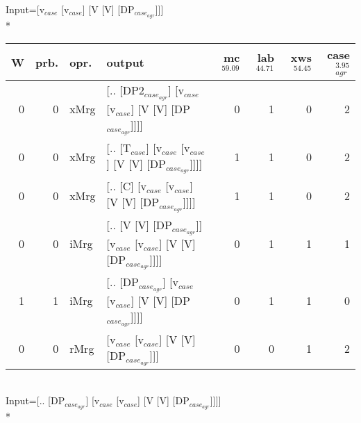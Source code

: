 \begingroup\scriptsize Input=[v$_{case}$ [v$_{case}$] [V [V] [DP$_{case_{agr}}$]]]\\*
\begin{tabularx}{\linewidth}{rrlXrrrr}
\hline
   W &   prb. & opr.   & output                                                             &   mc$^{59.09}$ &   lab$^{44.71}$ &   xws$^{54.45}$ &   case$_{agr}^{3.95}$ \\
\hline
   0 &   0 & xMrg & [.. [DP2$_{case_{agr}}$] [v$_{case}$ [v$_{case}$] [V [V] [DP$_{case_{agr}}$]]]]        &            0 &             1 &             0 &                  2 \\
   0 &   0 & xMrg & [.. [T$_{case}$] [v$_{case}$ [v$_{case}$] [V [V] [DP$_{case_{agr}}$]]]]              &            1 &             1 &             0 &                  2 \\
   0 &   0 & xMrg & [.. [C] [v$_{case}$ [v$_{case}$] [V [V] [DP$_{case_{agr}}$]]]]                   &            1 &             1 &             0 &                  2 \\
   0 &   0 & iMrg & [.. [V [V] [DP$_{case_{agr}}$]] [v$_{case}$ [v$_{case}$] [V [V] [DP$_{case_{agr}}$]]]] &            0 &             1 &             1 &                  1 \\
   1 &   1 & iMrg & [.. [DP$_{case_{agr}}$] [v$_{case}$ [v$_{case}$] [V [V] [DP$_{case_{agr}}$]]]]         &            0 &             1 &             1 &                  0 \\
   0 &   0 & rMrg & [v$_{case}$ [v$_{case}$] [V [V] [DP$_{case_{agr}}$]]]                            &            0 &             0 &             1 &                  2 \\
\hline
\end{tabularx}\endgroup\\
\begingroup\scriptsize Input=[.. [DP$_{case_{agr}}$] [v$_{case}$ [v$_{case}$] [V [V] [DP$_{case_{agr}}$]]]]\\*
